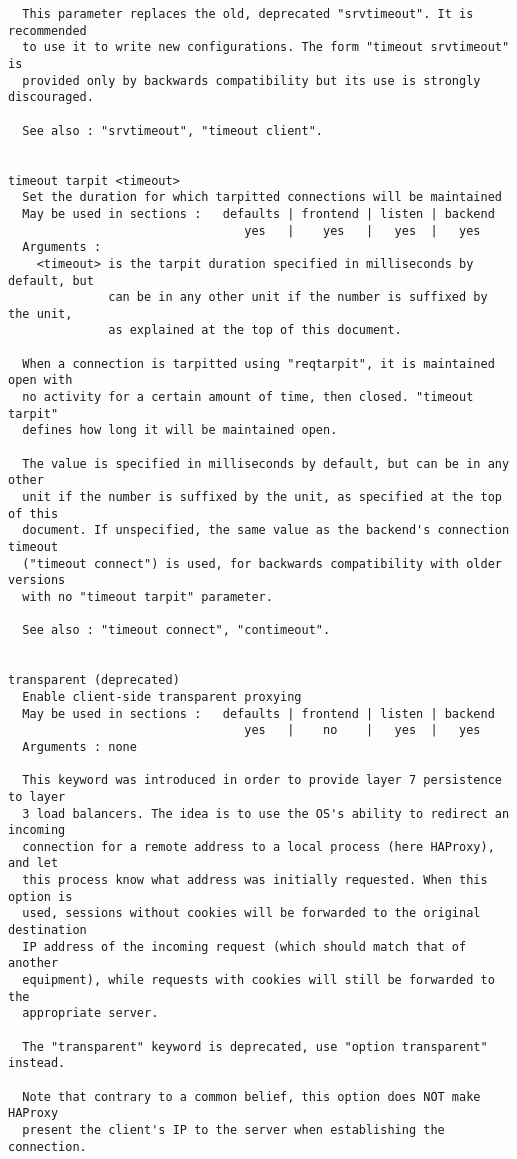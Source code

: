 \begin{verbatim}
  This parameter replaces the old, deprecated "srvtimeout". It is recommended
  to use it to write new configurations. The form "timeout srvtimeout" is
  provided only by backwards compatibility but its use is strongly discouraged.

  See also : "srvtimeout", "timeout client".


timeout tarpit <timeout>
  Set the duration for which tarpitted connections will be maintained
  May be used in sections :   defaults | frontend | listen | backend
                                 yes   |    yes   |   yes  |   yes
  Arguments :
    <timeout> is the tarpit duration specified in milliseconds by default, but
              can be in any other unit if the number is suffixed by the unit,
              as explained at the top of this document.

  When a connection is tarpitted using "reqtarpit", it is maintained open with
  no activity for a certain amount of time, then closed. "timeout tarpit"
  defines how long it will be maintained open.

  The value is specified in milliseconds by default, but can be in any other
  unit if the number is suffixed by the unit, as specified at the top of this
  document. If unspecified, the same value as the backend's connection timeout
  ("timeout connect") is used, for backwards compatibility with older versions
  with no "timeout tarpit" parameter.

  See also : "timeout connect", "contimeout".


transparent (deprecated)
  Enable client-side transparent proxying
  May be used in sections :   defaults | frontend | listen | backend
                                 yes   |    no    |   yes  |   yes
  Arguments : none

  This keyword was introduced in order to provide layer 7 persistence to layer
  3 load balancers. The idea is to use the OS's ability to redirect an incoming
  connection for a remote address to a local process (here HAProxy), and let
  this process know what address was initially requested. When this option is
  used, sessions without cookies will be forwarded to the original destination
  IP address of the incoming request (which should match that of another
  equipment), while requests with cookies will still be forwarded to the
  appropriate server.

  The "transparent" keyword is deprecated, use "option transparent" instead.

  Note that contrary to a common belief, this option does NOT make HAProxy
  present the client's IP to the server when establishing the connection.


\end{verbatim}
